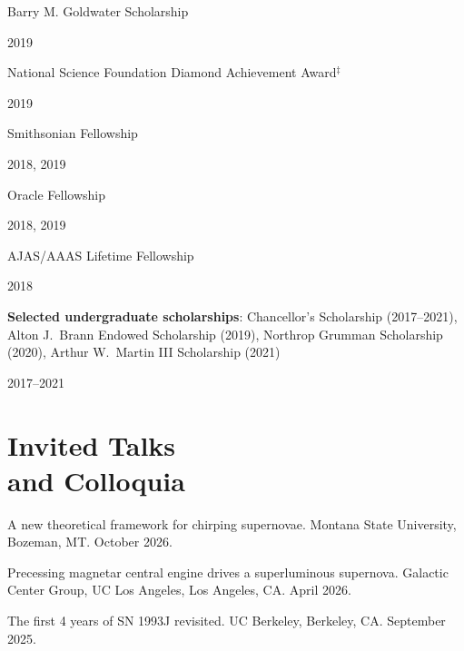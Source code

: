 \documentclass[margin,line]{res}
\newlength{\awarddatewd}
\newlength{\awardtmp}
\newcommand{\award}[3][black]{%
  \settowidth{\awarddatewd}{\quad 2018, 2019}%
  \settowidth{\awardtmp}{\quad 2017--2021}%
  \ifdim\awardtmp>\awarddatewd \setlength{\awarddatewd}{\awardtmp}\fi
  \noindent
  \parbox[t]{\dimexpr\linewidth-\leftskip-\awarddatewd\relax}%
    {\raggedright\leavevmode\color{#1}#2\strut}%
  \hfill{\color{#1}#3}}
\begin{document}
\begin{resume}
\vspace*{-2mm}
\award[Maroon]{Barry M. Goldwater Scholarship}{2019}
 
\vspace*{-2mm}
\award{National Science Foundation Diamond Achievement Award$^\ddag$}{2019}
 
\vspace*{-2mm}
\award{Smithsonian Fellowship}{2018, 2019}
 
\vspace*{-2mm}
\award{Oracle Fellowship}{2018, 2019}
 
\vspace*{-2mm}
\award{AJAS/AAAS Lifetime Fellowship}{2018}
 
\vspace*{-2mm}
\award{\textbf{Selected undergraduate scholarships}: Chancellor's Scholarship (2017--2021), Alton J.~Brann Endowed Scholarship (2019), Northrop Grumman Scholarship (2020), Arthur W.~Martin III Scholarship (2021)}{2017--2021}
 




\vspace{+.0cm}
\section{\sc Invited Talks \\ and Colloquia}


A new theoretical framework for chirping supernovae.  Montana State University, Bozeman, MT. October 2026.

\vspace*{-2mm}
Precessing magnetar central engine drives a superluminous supernova. Galactic Center Group, UC Los Angeles, Los Angeles, CA. April 2026.

\vspace*{-2mm}
The first 4 years of SN 1993J revisited. UC Berkeley, Berkeley, CA. September 2025.


\end{resume}
\end{document}
